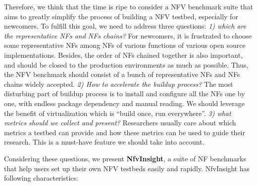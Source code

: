 Therefore, we think that the time is ripe to consider a NFV benchmark suite that aims to greatly simplify the process of building a NFV testbed, especially for newcomers. To fulfill this goal, we need to address three questions:
\textit{1) which are the representative NFs and NFs chains?} For newcomers, it is frustrated to choose some representative NFs among NFs of various functions of various open source implementations. Besides, the order of NFs chained together is also important, and should be closed to the production environments as much as possible. Thus, the NFV benchmark should consist of a bunch of representative NFs and NFs chains widely accepted.
\textit{2) How to accelerate the buildup process?} The most disturbing part of buildup process is to install and configure all the NFs one by one, with endless package dependency and manual reading. We should leverage the benefit of virtualization which is ``build once, run everywhere''.
\textit{3) what metrics should we collect and present?} Researchers usually care about which metrics a testbed
can provide and how these metrics can be used to guide their research. This is a must-have feature we should take into account.

Considering these questions, we present \textbf{NfvInsight}, a suite of NF benchmarks that help users set up their own NFV testbeds easily and rapidly. NfvInsight has following characteristics:






